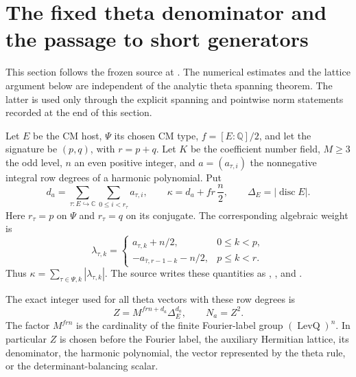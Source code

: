 \section{The fixed theta denominator and the passage to short generators}
\label{sec:ftb-denominator-generators}

This section follows the frozen source at
.
The numerical estimates and the lattice argument below are independent
of the analytic theta spanning theorem.  The latter is used only
through the explicit spanning and pointwise norm statements recorded
at the end of this section.

Let \(E\) be the CM host, \(\Psi\) its chosen CM type,
\(f=[E:\mathbb Q]/2\), and let the signature be \((p,q)\), with
\(r=p+q\).  Let \(K\) be the coefficient number field, \(M\ge3\) the odd
level, \(n\) an even positive integer, and
\(a=(a_{\tau,i})\) the nonnegative integral row degrees of a harmonic
polynomial.  Put
\[
 d_a=\sum_{\tau:E\hookrightarrow\mathbb C}
             \sum_{0\le i<r_\tau}a_{\tau,i},\qquad
 \kappa=d_a+fr\,\frac n2,\qquad
 \Delta_E=|\operatorname{disc}E|.
\]
Here \(r_\tau=p\) on \(\Psi\) and \(r_\tau=q\) on its conjugate.
The corresponding algebraic weight is
\[
 \lambda_{\tau,k}=
 \begin{cases}
 a_{\tau,k}+n/2,&0\le k<p,\\
 -a_{\bar\tau,r-1-k}-n/2,&p\le k<r .
 \end{cases}
\]
Thus \(\kappa=\sum_{\tau\in\Psi,k}|\lambda_{\tau,k}|\).
The source writes these quantities as
, , and .

The exact integer used for all theta vectors with these row degrees is
\begin{equation}\label{eq:ftb-intZ}
 Z=M^{frn+d_a}\Delta_E^{d_a},\qquad N_a=Z^2.
\end{equation}
The factor \(M^{frn}\) is the cardinality of the finite Fourier-label
group \((\operatorname{LevQ})^n\).  In particular \(Z\) is chosen before
the Fourier label, the auxiliary Hermitian lattice, its denominator,
the harmonic polynomial, the vector represented by the theta rule,
or the determinant-balancing scalar.

